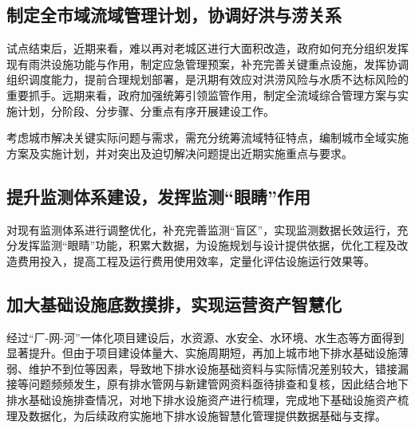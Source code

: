 \documentclass[]{book}
\begin{document}
\hypertarget{ux5236ux5b9aux5168ux5e02ux57dfux6d41ux57dfux7ba1ux7406ux8ba1ux5212ux534fux8c03ux597dux6d2aux4e0eux6d9dux5173ux7cfb}{%
\subsection{制定全市域流域管理计划，协调好洪与涝关系}\label{ux5236ux5b9aux5168ux5e02ux57dfux6d41ux57dfux7ba1ux7406ux8ba1ux5212ux534fux8c03ux597dux6d2aux4e0eux6d9dux5173ux7cfb}}

试点结束后，近期来看，难以再对老城区进行大面积改造，政府如何充分组织发挥现有雨洪设施功能与作用，制定应急管理预案，补充完善关键重点设施，发挥协调组织调度能力，提前合理规划部署，是汛期有效应对洪涝风险与水质不达标风险的重要抓手。远期来看，政府加强统筹引领监管作用，制定全流域综合管理方案与实施计划，分阶段、分步骤、分重点有序开展建设工作。

考虑城市解决关键实际问题与需求，需充分统筹流域特征特点，编制城市全域实施方案及实施计划，并对突出及迫切解决问题提出近期实施重点与要求。

\hypertarget{ux63d0ux5347ux76d1ux6d4bux4f53ux7cfbux5efaux8bbeux53d1ux6325ux76d1ux6d4bux773cux775bux4f5cux7528}{%
\subsection{提升监测体系建设，发挥监测``眼睛''作用}\label{ux63d0ux5347ux76d1ux6d4bux4f53ux7cfbux5efaux8bbeux53d1ux6325ux76d1ux6d4bux773cux775bux4f5cux7528}}

对现有监测体系进行调整优化，补充完善监测``盲区''，实现监测数据长效运行，充分发挥监测``眼睛''功能，积累大数据，为设施规划与设计提供依据，优化工程及改造费用投入，提高工程及运行费用使用效率，定量化评估设施运行效果等。

\hypertarget{ux52a0ux5927ux57faux7840ux8bbeux65bdux5e95ux6570ux6478ux6392ux5b9eux73b0ux8fd0ux8425ux8d44ux4ea7ux667aux6167ux5316}{%
\subsection{加大基础设施底数摸排，实现运营资产智慧化}\label{ux52a0ux5927ux57faux7840ux8bbeux65bdux5e95ux6570ux6478ux6392ux5b9eux73b0ux8fd0ux8425ux8d44ux4ea7ux667aux6167ux5316}}

经过``厂-网-河''一体化项目建设后，水资源、水安全、水环境、水生态等方面得到显著提升。但由于项目建设体量大、实施周期短，再加上城市地下排水基础设施薄弱、维护不到位等因素，导致地下排水设施基础资料与实际情况差别较大，错接漏接等问题频频发生，原有排水管网与新建管网资料亟待排查和复核，因此结合地下排水基础设施排查情况，对地下排水设施资产进行梳理，完成地下基础设施资产梳理及数据化，为后续政府实施地下排水设施智慧化管理提供数据基础与支撑。
\end{document}
